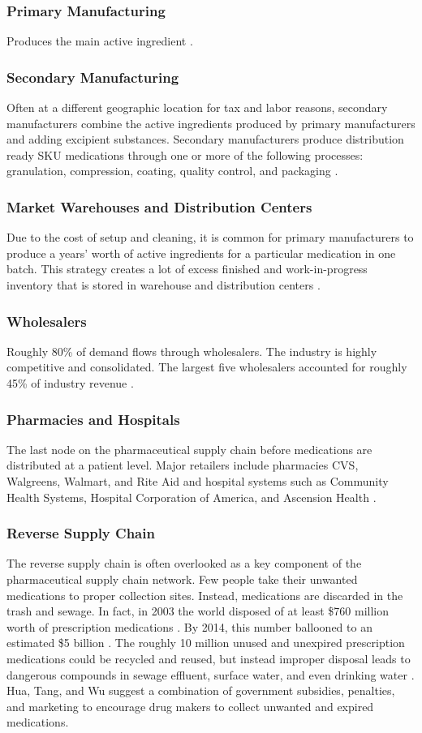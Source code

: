\documentclass[sigconf]{acmart}
\begin{document}
\subsubsection{Primary Manufacturing} Produces the main active ingredient \cite{Shah01}.
\subsubsection{Secondary Manufacturing} Often at a different geographic location for tax and labor reasons, secondary manufacturers combine the active ingredients produced by primary manufacturers and adding excipient substances. Secondary manufacturers produce distribution ready SKU medications through one or more of the following processes: granulation, compression, coating, quality control, and packaging \cite{Shah01}.
\subsubsection{Market Warehouses and Distribution Centers} Due to the cost of setup and cleaning, it is common for primary manufacturers to produce a years' worth of active ingredients for a particular medication in one batch. This strategy creates a lot of excess finished and work-in-progress inventory that is stored in warehouse and distribution centers \cite{Shah01}.
\subsubsection{Wholesalers} Roughly 80\% of demand flows through wholesalers. The industry is highly competitive and consolidated. The largest five wholesalers accounted for roughly 45\% of industry revenue \cite{Shah01} \cite{Hoovers01}.
\subsubsection{Pharmacies and Hospitals} The last node on the pharmaceutical supply chain before medications are distributed at a patient level. Major retailers include pharmacies CVS, Walgreens, Walmart, and Rite Aid and hospital systems such as Community Health Systems, Hospital Corporation of America, and Ascension Health \cite{Shah01}. 
\subsubsection{Reverse Supply Chain} The reverse supply chain is often overlooked as a key component of the pharmaceutical supply chain network. Few people take their unwanted medications to proper collection sites. Instead, medications are discarded in the trash and sewage. In fact, in 2003 the world disposed of at least \$760 million worth of prescription medications \cite{Hua01}. By 2014, this number ballooned to an estimated \$5 billion \cite{Lenzerg01}. The roughly 10 million unused and unexpired prescription medications could be recycled and reused, but instead improper disposal leads to dangerous compounds in sewage effluent, surface water, and even drinking water \cite{Hua01} \cite{Lenzerg01}.  Hua, Tang, and Wu \cite{Hua01} suggest a combination of government subsidies, penalties, and marketing to encourage drug makers to collect unwanted and expired medications. 
\end{document}
